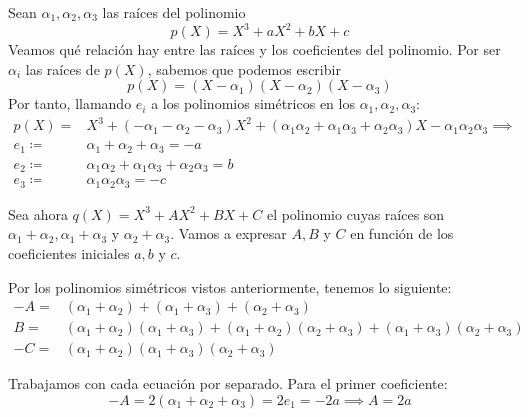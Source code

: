 \documentclass[a4paper, 11pt]{article}
\begin{document}
  \maketitle

  \begin{ejercicio}
  \end{ejercicio}

  \begin{solucion}
      \begin{apartado}
          Sean $\alpha_1, \alpha_2, \alpha_3$ las raíces del polinomio \[p(X) = X^3 + aX^2 + bX +c\]
          Veamos qué relación hay entre las raíces y los coeficientes del polinomio. Por ser $\alpha_i$ las raíces de $p(X)$, sabemos que podemos escribir \[p(X) = (X-\alpha_1)(X-\alpha_2)(X-\alpha_3)\]
          Por tanto, llamando $e_i$ a los polinomios simétricos en los $\alpha_1, \alpha_2, \alpha_3$:
          \begin{align*}
             p(X) =& X^3 + (-\alpha_1 -\alpha_2 -\alpha_3)X^2 + (\alpha_1\alpha_2 + \alpha_1\alpha_3 + \alpha_2\alpha_3)X - \alpha_1\alpha_2\alpha_3 \implies \\
             e_1 \coloneqq& \alpha_1 + \alpha_2 + \alpha_3 = -a\\
             e_2 \coloneqq& \alpha_1\alpha_2 + \alpha_1\alpha_3 + \alpha_2\alpha_3 = b\\
             e_3 \coloneqq& \alpha_1\alpha_2\alpha_3 = -c
          \end{align*}

          Sea ahora $q(X) = X^3 + AX^2 + BX + C$ el polinomio cuyas raíces son $\alpha_1+\alpha_2, \alpha_1+\alpha_3$ y $\alpha_2+\alpha_3$. Vamos a expresar $A,B$ y $C$ en función de los coeficientes iniciales $a,b$ y $c$.

          Por los polinomios simétricos vistos anteriormente, tenemos lo siguiente:
          \begin{align*}
              -A =& (\alpha_1+\alpha_2) + (\alpha_1+\alpha_3) + (\alpha_2+\alpha_3) \\
              B =& (\alpha_1+\alpha_2)(\alpha_1+\alpha_3) + (\alpha_1+\alpha_2)(\alpha_2+\alpha_3) + (\alpha_1+\alpha_3)(\alpha_2+\alpha_3)\\
              -C =& (\alpha_1+\alpha_2)(\alpha_1+\alpha_3)(\alpha_2+\alpha_3)
          \end{align*}

          Trabajamos con cada ecuación por separado. Para el primer coeficiente:
          \[
          -A = 2(\alpha_1 + \alpha_2 + \alpha_3) = 2e_1 = -2a \implies \boxed{A = 2a}
          \]


\end{apartado}
\end{solucion}
\end{document}
